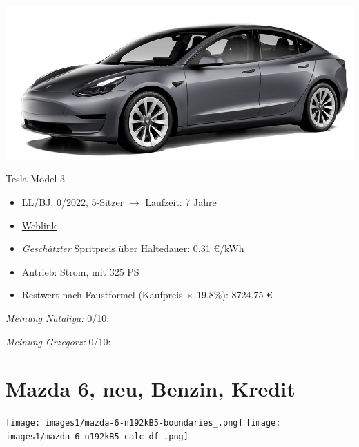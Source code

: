 \documentclass[landscape, DIV=99, 14pt]{scrartcl}
\begin{document}
\pagebreak
\begin{center}
\includegraphics[width=0.9\columnwidth]{cars/tesla-model-3.jpg}

Tesla Model 3
\end{center}

\begin{itemize}
    \item LL/BJ: 0/2022, 5-Sitzer $\rightarrow$ Laufzeit: 7 Jahre
    \item \href{https://www.tesla.com/de_de/model3/design\#overview}{Weblink}
    \item \emph{Gesch\"atzter} Spritpreis \"uber Haltedauer: 0.31 \euro{}/kWh
    \item Antrieb: Strom, mit 325 PS
    \item Restwert nach Faustformel (Kaufpreis $\times$ 19.8\%): 8724.75 \euro{}
\end{itemize}

\begin{small}
\emph{Meinung Nataliya:} 0/10: 
        
\emph{Meinung Grzegorz:} 0/10: 
\end{small}

\pagebreak


\twocolumn

\section*{Mazda 6, neu, Benzin, Kredit}
\begin{center}
\texttt{[image: images1/mazda-6-n192kB5-boundaries\_.png]}
\null
\vspace{0.5cm}
\texttt{[image: images1/mazda-6-n192kB5-calc\_df\_.png]}
\end{center}
\end{document}
